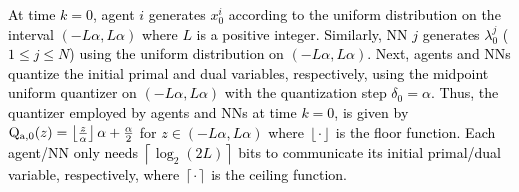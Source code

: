\documentclass[10pt,twocolumn,twoside]{IEEEtran}
\begin{document}
\textcolor{black}{At time $k=0$, agent $i$ generates $x^i_0$ according to the uniform distribution on the interval $\left(-L\alpha,L\alpha\right)$ where $L$ is a positive integer. Similarly, NN $j$ generates $\lambda^j_0$ ($1\leq j\leq N$) using the uniform distribution on $\left(-L\alpha,L\alpha\right)$. Next, agents and NNs quantize the initial primal and dual variables, respectively, using the midpoint uniform quantizer on $\left(-L\alpha,L\alpha\right)$ with the quantization step $\delta_0=\alpha$. Thus, the quantizer employed by agents and NNs at time $k=0$, is given by ${\rm Q}_{{\rm a},0}{\left({z}\right)}=\left\lfloor \frac{z}{\alpha}\right\rfloor\alpha+\frac{\alpha}{2}$ for $z\in\left(-L\alpha,L\alpha\right)$ where $\left\lfloor \cdot\right\rfloor$ is the floor function. Each agent/NN only needs $\left\lceil \log_2{\left({2L}\right)}\right\rceil$ bits to communicate its initial primal/dual variable, respectively, where $\left\lceil \cdot\right\rceil$ is the ceiling function.}
\end{document}
